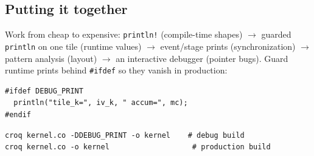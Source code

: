 \subsection*{Putting it together}

Work from cheap to expensive: \texttt{println!} (compile-time shapes) \(\rightarrow\) guarded \texttt{println} on one tile (runtime values) \(\rightarrow\) event/stage prints (synchronization) \(\rightarrow\) pattern analysis (layout) \(\rightarrow\) an interactive debugger (pointer bugs). Guard runtime prints behind \texttt{\#ifdef} so they vanish in production:

\begin{lstlisting}[language=croqtile,caption={Guarding debug prints}]
#ifdef DEBUG_PRINT
  println("tile_k=", iv_k, " accum=", mc);
#endif
\end{lstlisting}

\begin{lstlisting}[language={},caption={Debug and production builds}]
croq kernel.co -DDEBUG_PRINT -o kernel    # debug build
croq kernel.co -o kernel                   # production build
\end{lstlisting}
